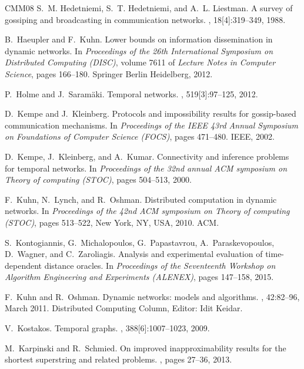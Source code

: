 \documentclass[oribibl, 11pt]{llncs}
\begin{document}
\begin{thebibliography}{CMM{\etalchar{+}}08}
S.~M. Hedetniemi, S.~T. Hedetniemi, and A.~L. Liestman.
\newblock A survey of gossiping and broadcasting in communication networks.
, 18[4]:319--349, 1988.

B.~Haeupler and F.~Kuhn.
\newblock Lower bounds on information dissemination in dynamic networks.
\newblock In {\em Proceedings of the 26th International Symposium on
  Distributed Computing (DISC)}, volume 7611 of {\em Lecture Notes in Computer
  Science}, pages 166--180. Springer Berlin Heidelberg, 2012.

P.~Holme and J.~Saram{\"a}ki.
\newblock Temporal networks.
, 519[3]:97--125, 2012.

D.~Kempe and J.~Kleinberg.
\newblock Protocols and impossibility results for gossip-based communication
  mechanisms.
\newblock In {\em Proceedings of the IEEE 43rd Annual Symposium on Foundations
  of Computer Science (FOCS)}, pages 471--480. IEEE, 2002.

D.~Kempe, J.~Kleinberg, and A.~Kumar.
\newblock Connectivity and inference problems for temporal networks.
\newblock In {\em Proceedings of the 32nd annual ACM symposium on Theory of
  computing (STOC)}, pages 504--513, 2000.

F.~Kuhn, N.~Lynch, and R.~Oshman.
\newblock Distributed computation in dynamic networks.
\newblock In {\em Proceedings of the 42nd ACM symposium on Theory of computing
  (STOC)}, pages 513--522, New York, NY, USA, 2010. ACM.

S.~Kontogiannis, G.~Michalopoulos, G.~Papastavrou, A.~Paraskevopoulos,
  D.~Wagner, and C.~Zaroliagis.
\newblock Analysis and experimental evaluation of time-dependent distance
  oracles.
\newblock In {\em Proceedings of the Seventeenth Workshop on Algorithm
  Engineering and Experiments (ALENEX)}, pages 147--158, 2015.

F.~Kuhn and R.~Oshman.
\newblock Dynamic networks: models and algorithms.
, 42:82--96, March 2011.
\newblock Distributed Computing Column, Editor: Idit Keidar.

V.~Kostakos.
\newblock Temporal graphs.
,
  388[6]:1007--1023, 2009.

M.~Karpinski and R.~Schmied.
\newblock On improved inapproximability results for the shortest superstring
  and related problems.
, pages 27--36, 2013.


\end{thebibliography}
\end{document}
